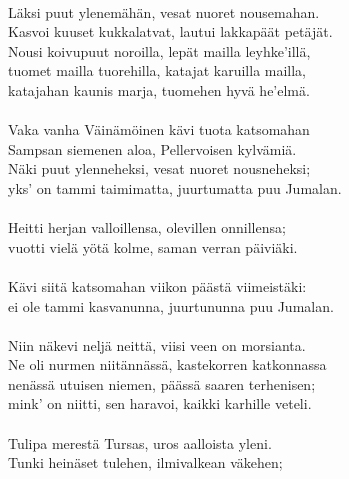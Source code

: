                                                                 \\
Läksi puut ylenemähän, vesat nuoret nousemahan.                 \\
Kasvoi kuuset kukkalatvat, lautui lakkapäät petäjät.            \\
Nousi koivupuut noroilla, lepät mailla leyhke'illä,             \\
tuomet mailla tuorehilla, katajat karuilla mailla,              \\
katajahan kaunis marja, tuomehen hyvä he'elmä.                  \\
                                                                \\
Vaka vanha Väinämöinen kävi tuota katsomahan                    \\
Sampsan siemenen aloa, Pellervoisen kylvämiä.                   \\
Näki puut ylenneheksi, vesat nuoret nousneheksi;                \\
yks' on tammi taimimatta, juurtumatta puu Jumalan.              \\
                                                                \\
Heitti herjan valloillensa, olevillen onnillensa;               \\
vuotti vielä yötä kolme, saman verran päiviäki.                 \\
                                                                \\
Kävi siitä katsomahan viikon päästä viimeistäki:                \\
ei ole tammi kasvanunna, juurtununna puu Jumalan.               \\
                                                                \\
Niin näkevi neljä neittä, viisi veen on morsianta.              \\
Ne oli nurmen niitännässä, kastekorren katkonnassa              \\
nenässä utuisen niemen, päässä saaren terhenisen;               \\
mink' on niitti, sen haravoi, kaikki karhille veteli.           \\
                                                                \\
Tulipa merestä Tursas, uros aalloista yleni.                    \\
Tunki heinäset tulehen, ilmivalkean väkehen;                    \\
